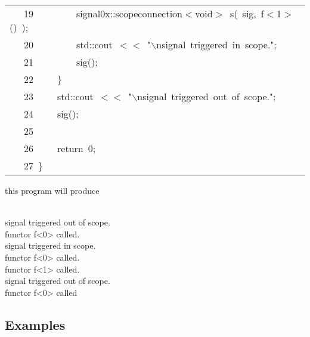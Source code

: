 \documentclass[9pt,onside,a4paper]{article}
\newcommand{\hlstd}[1]{\textcolor[rgb]{0.2,0,0.4}{#1}}
\newcommand{\hlnum}[1]{\textcolor[rgb]{0.2,0.73,0.02}{#1}}
\newcommand{\hlesc}[1]{\textcolor[rgb]{0.65,0.09,0.38}{#1}}
\newcommand{\hlstr}[1]{\textcolor[rgb]{0.09,0.38,0.65}{#1}}
\newcommand{\hlopt}[1]{\textcolor[rgb]{0.33,0.33,0.33}{#1}}
\newcommand{\hllin}[1]{\textcolor[rgb]{0.6,0.6,0.6}{#1}}
\newcommand{\hlkwa}[1]{\textcolor[rgb]{1,0.19,0.19}{#1}}
\newcommand{\hlkwb}[1]{\textcolor[rgb]{0.96,0.55,0.14}{#1}}
\newcommand{\hlkwd}[1]{\textcolor[rgb]{0.82,0.11,0.93}{#1}}
\begin{document}
\begin{center}
\begin{xtabular}{||l||}
\hllin{\ \ \ 19\ }\hlstd{}\hlstd{\ \ \ \ \ \ \ \ }\hlstd{signal0x}\hlopt{::}\hlstd{scope\textunderscore connection}\hlopt{$<$}\hlstd{}\hlkwb{void}\hlstd{}\hlopt{$>$\ }\hlstd{}\hlkwd{s}\hlstd{}\hlopt{(\ }\hlstd{sig}\hlopt{,\ }\hlstd{f}\hlopt{$<$}\hlstd{}\hlnum{1}\hlstd{}\hlopt{$>$()\ );}\\
\hllin{\ \ \ 20\ }\hlstd{}\hlstd{\ \ \ \ \ \ \ \ }\hlstd{std}\hlopt{::}\hlstd{cout\ }\hlopt{$<$$<$\ }\hlstd{}\hlstr{"}\hlesc{$\backslash$n}\hlstr{signal\ triggered\ in\ scope."}\hlstd{}\hlopt{;}\\
\hllin{\ \ \ 21\ }\hlstd{}\hlstd{\ \ \ \ \ \ \ \ }\hlstd{}\hlkwd{sig}\hlstd{}\hlopt{();}\\
\hllin{\ \ \ 22\ }\hlstd{}\hlstd{\ \ \ \ }\hlstd{}\hlopt{\}}\\
\hllin{\ \ \ 23\ }\hlstd{}\hlstd{\ \ \ \ }\hlstd{std}\hlopt{::}\hlstd{cout\ }\hlopt{$<$$<$\ }\hlstd{}\hlstr{"}\hlesc{$\backslash$n}\hlstr{signal\ triggered\ out\ of\ scope."}\hlstd{}\hlopt{;}\\
\hllin{\ \ \ 24\ }\hlstd{}\hlstd{\ \ \ \ }\hlstd{}\hlkwd{sig}\hlstd{}\hlopt{();}\\
\hllin{\ \ \ 25\ }\hlstd{}\\
\hllin{\ \ \ 26\ }\hlstd{\ \ \ \ }\hlstd{}\hlkwa{return\ }\hlstd{}\hlnum{0}\hlstd{}\hlopt{;}\\
\hllin{\ \ \ 27\ }\hlstd{}\hlopt{\}}\hlstd{}\\
\hline
\end{xtabular}
\end{center}
\normalfont
\normalsize

this program will produce 
\begin{shaded}
{\small
\ttfamily
~\\
signal triggered out of scope. \\
functor f<0> called. \\
signal triggered in scope. \\
functor f<0> called. \\
functor f<1> called. \\
signal triggered out of scope. \\
functor f<0> called 
\normalfont
}
\end{shaded}





\subsection{Examples}
\end{document}
